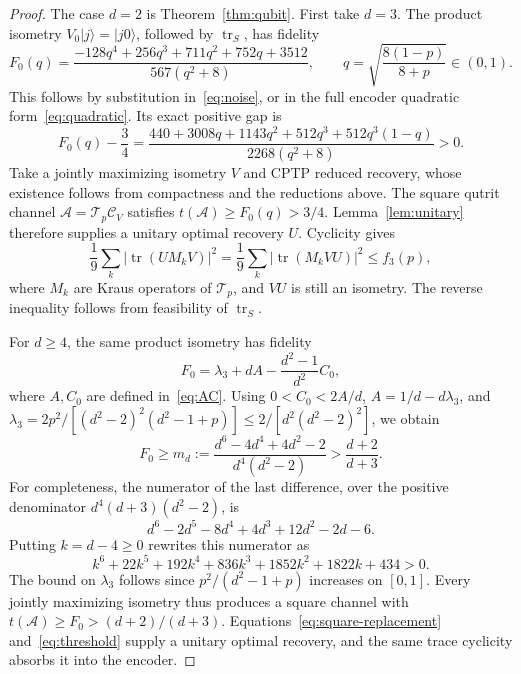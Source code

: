 \documentclass[11pt]{article}
\newcommand{\tr}{\operatorname{tr}}
\newcommand{\ket}[1]{\lvert#1\rangle}
\newcommand{\T}{\mathcal T}
\newcommand{\C}{\mathcal C}
\begin{document}
\begin{proof}
The case $d=2$ is Theorem~\ref{thm:qubit}. First take $d=3$.
The product isometry $V_0\ket j=\ket{j0}$, followed by $\tr_S$, has fidelity
\begin{equation}\label{eq:product}
 F_0(q)=\frac{-128q^4+256q^3+711q^2+752q+3512}{567(q^2+8)},
 \qquad q=\sqrt{\frac{8(1-p)}{8+p}}\in(0,1).
\end{equation}
This follows by substitution in~\eqref{eq:noise}, or in the full encoder
quadratic form~\eqref{eq:quadratic}. Its exact positive gap is
\begin{equation}\label{eq:product-gap}
 F_0(q)-\frac34=
 \frac{440+3008q+1143q^2+512q^3+512q^3(1-q)}{2268(q^2+8)}>0.
\end{equation}
Take a jointly maximizing isometry $V$ and CPTP reduced recovery, whose
existence follows from compactness and the reductions above. The square
qutrit channel $\mathcal A=\T_p\C_V$ satisfies
$t(\mathcal A)\ge F_0(q)>3/4$. Lemma~\ref{lem:unitary} therefore supplies
a unitary optimal recovery $U$. Cyclicity gives
\[
 \frac19\sum_k|\tr(UM_kV)|^2
 =\frac19\sum_k|\tr(M_kVU)|^2\le f_3(p),
\]
where $M_k$ are Kraus operators of $\T_p$, and $VU$ is still an isometry.
The reverse inequality follows from feasibility of $\tr_S$.

For $d\ge4$, the same product isometry has fidelity
\[
 F_0=\lambda_3+dA-\frac{d^2-1}{d^2}C_0,
\]
where $A,C_0$ are defined in~\eqref{eq:AC}. Using $0<C_0<2A/d$,
$A=1/d-d\lambda_3$, and
$\lambda_3=2p^2/[(d^2-2)^2(d^2-1+p)]\le
2/[d^2(d^2-2)^2]$, we obtain
\begin{equation}\label{eq:product-general}
 F_0\ge m_d:=\frac{d^6-4d^4+4d^2-2}{d^4(d^2-2)}
 >\frac{d+2}{d+3}.
\end{equation}
For completeness, the numerator of the last difference, over the positive
denominator $d^4(d+3)(d^2-2)$, is
\[
 d^6-2d^5-8d^4+4d^3+12d^2-2d-6.
\]
Putting $k=d-4\ge0$ rewrites this numerator as
\[
 k^6+22k^5+192k^4+836k^3+1852k^2+1822k+434>0.
\]
The bound on $\lambda_3$ follows since $p^2/(d^2-1+p)$ increases on
$[0,1]$. Every jointly maximizing isometry thus produces a square channel
with $t(\mathcal A)\ge F_0>(d+2)/(d+3)$. Equations~\eqref{eq:square-replacement}
and~\eqref{eq:threshold} supply a unitary optimal recovery, and the same
trace cyclicity absorbs it into the encoder.
\end{proof}
\end{document}
